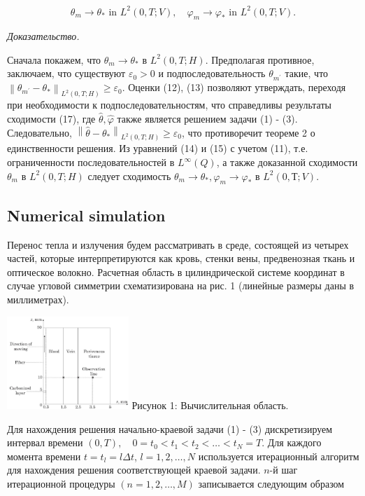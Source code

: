 $$
\theta_{m} \rightarrow \theta_{*} \text { in } L^{2}(0, T ; V),
\quad \varphi_{m} \rightarrow \varphi_{*} \text { in } L^{2}(0, T ; V).
$$

\textit{Доказательство.}

Сначала покажем, что $\theta_{m} \rightarrow \theta_{*}$ в $L^{2}(0, T ; H)$.
Предполагая противное, заключаем, что существуют $\varepsilon_{0}>0$ и подпоследовательность
$\theta_{m^{\prime}}$ такие, что
$\left\|\theta_{m^{\prime}} -\theta_{*}\right\|_{L^{2}(0, T ; H)} \geq \varepsilon_{0}$.
Оценки (12), (13) позволяют утверждать, переходя при необходимости к подпоследовательностям,
что справедливы результаты сходимости (17), где $\widehat{\theta}, \widehat{\varphi}$
также является решением задачи (1) - (3).
Следовательно, $\left\|\widehat{\theta}-\theta_{*}\right\|_{L^{2}(0, T ; H)} \geq \varepsilon_{0}$,
что противоречит теореме 2 о единственности решения.
Из уравнений (14) и (15) с учетом (11), т.е. ограниченности последовательностей в $L^{\infty}(Q)$,
а также доказанной сходимости $\theta_{m}$ в $L^{2}(0, T ; H)$
следует сходимость $\theta_{m} \rightarrow \theta_{*}, \varphi_{m} \rightarrow \varphi_{*}$ в $L^ {2}(0, Т; V).$

\subsection{Numerical simulation}\label{subsec:ch3:sec1:subsec5}

Перенос тепла и излучения будем рассматривать в среде, состоящей из четырех частей,
которые интерпретируются как кровь, стенки вены, предвенозная ткань и оптическое волокно.
Расчетная область в цилиндрической системе координат в случае угловой симметрии схематизирована
на рис. 1 (линейные размеры даны в миллиметрах).

\includegraphics[height=3.5cm]{images/6_chebotarev.jpg}
Рисунок 1: Вычислительная область.

Для нахождения решения начально-краевой задачи (1) - (3) дискретизируем
интервал времени $(0, T), \quad 0=t_{0}<t_{1}<t_{2}< \ldots<t_{N}=T$.
Для каждого момента времени $t=t_{l}=l \Delta t$, $l=1,2, \ldots, N$
используется итерационный алгоритм для нахождения решения соответствующей краевой задачи.
$n$-й шаг итерационной процедуры $(n=1,2,\ldots,M)$ записывается следующим образом

